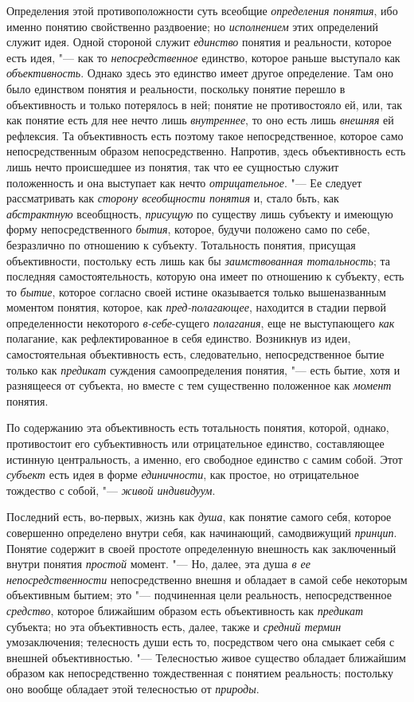 {{Определения этой противоположности суть всеобщие
{\em определения понятия},
ибо именно понятию свойственно раздвоение; но
{\em исполнением} этих
определений служит идея. Одной стороной служит
{\em единство} понятия и
реальности, которое есть идея, "--- как то
{\em непосредственное}
единство, которое раньше выступало как
{\em объективность}.
Однако здесь это единство имеет другое определение. Там оно
было единством понятия и реальности, поскольку понятие перешло в
объективность и только потерялось в ней; понятие не противостояло ей, или,
так как понятие есть для нее нечто лишь
{\em внутреннее}, то оно
есть лишь {\em внешняя}
ей рефлексия. Та объективность есть поэтому такое
непосредственное, которое само непосредственным образом непосредственно.
Напротив, здесь объективность есть лишь нечто происшедшее из понятия, так
что ее сущностью служит положенность и она выступает как нечто
{\em отрицательное}. "--- Ее
следует рассматривать как {\em сторону
всеобщности понятия} и, стало бьть, как
{\em абстрактную}
всеобщность,
{\em присущую} по
существу лишь субъекту и имеющую форму непосредственного
{\em бытия}, которое,
будучи положено само по себе, безразлично по отношению к субъекту.
Тотальность понятия, присущая объективности, постольку есть лишь как бы
{\em заимствованная тотальность};
та последняя самостоятельность, которую она
имеет по отношению к субъекту, есть то
{\em бытие}, которое
согласно своей истине оказывается только вышеназванным моментом понятия,
которое, как {\em пред-полагающее},
находится в стадии первой определенности некоторого
{\em в-себе}{}-сущего
{\em полагания}, еще не
выступающего {\em как}
полагание, как рефлектированное в себя единство. Возникнув
из идеи, самостоятельная объективность есть, следовательно,
непосредственное бытие только как
{\em предикат} суждения
самоопределения понятия, "--- есть бытие, хотя и разнящееся от
субъекта, но вместе с тем существенно положенное как
{\em момент} понятия.

По содержанию эта объективность есть тотальность понятия,
которой, однако, противостоит его субъективность или отрицательное
единство, составляющее истинную центральность, а именно, его свободное
единство с самим собой. Этот
{\em субъект} есть идея в
форме {\em единичности},
как простое, но отрицательное тождество с собой, "---
{\em живой индивидуум}.

Последний есть, во-первых, жизнь как
{\em душа}, как понятие
самого себя, которое совершенно определено внутри себя, как начинающий,
самодвижущий {\em принцип}.
Понятие содержит в своей простоте определенную внешность как
заключенный внутри понятия
{\em простой} момент. "---
Но, далее, эта душа {\em в
ее непосредственности} непосредственно внешня и обладает в
самой себе некоторым объективным бытием; это "--- подчиненная
цели реальность, непосредственное
{\em средство}, которое
ближайшим образом есть объективность как
{\em предикат} субъекта;
но эта объективность есть, далее, также и
{\em средний термин}
умозаключения; телесность души есть то, посредством чего она
смыкает себя с внешней объективностью. "--- Телесностью живое
существо обладает ближайшим образом как непосредственно тождественная с
понятием реальность; постольку оно вообще обладает этой телесностью от
{\em природы}.

}}
